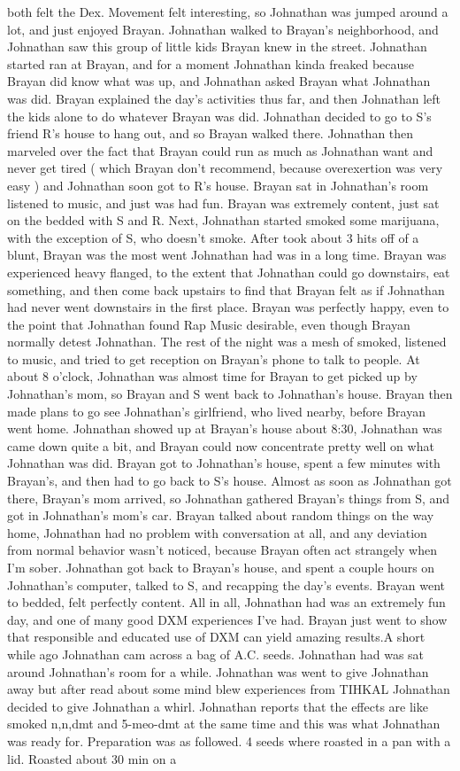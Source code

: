 \documentclass[12pt]{book}
\begin{document}
both felt the Dex. Movement felt interesting, so Johnathan was jumped around a lot, and just enjoyed Brayan. Johnathan walked to Brayan's neighborhood, and Johnathan saw this group of little kids Brayan knew in the street. Johnathan started ran at Brayan, and for a moment Johnathan kinda freaked because Brayan did know what was up, and Johnathan asked Brayan what Johnathan was did. Brayan explained the day's activities thus far, and then Johnathan left the kids alone to do whatever Brayan was did. Johnathan decided to go to S's friend R's house to hang out, and so Brayan walked there. Johnathan then marveled over the fact that Brayan could run as much as Johnathan want and never get tired ( which Brayan don't recommend, because overexertion was very easy ) and Johnathan soon got to R's house. Brayan sat in Johnathan's room listened to music, and just was had fun. Brayan was extremely content, just sat on the bedded with S and R. Next, Johnathan started smoked some marijuana, with the exception of S, who doesn't smoke. After took about 3 hits off of a blunt, Brayan was the most went Johnathan had was in a long time. Brayan was experienced heavy flanged, to the extent that Johnathan could go downstairs, eat something, and then come back upstairs to find that Brayan felt as if Johnathan had never went downstairs in the first place. Brayan was perfectly happy, even to the point that Johnathan found Rap Music desirable, even though Brayan normally detest Johnathan. The rest of the night was a mesh of smoked, listened to music, and tried to get reception on Brayan's phone to talk to people. At about 8 o'clock, Johnathan was almost time for Brayan to get picked up by Johnathan's mom, so Brayan and S went back to Johnathan's house. Brayan then made plans to go see Johnathan's girlfriend, who lived nearby, before Brayan went home. Johnathan showed up at Brayan's house about 8:30, Johnathan was came down quite a bit, and Brayan could now concentrate pretty well on what Johnathan was did. Brayan got to Johnathan's house, spent a few minutes with Brayan's, and then had to go back to S's house. Almost as soon as Johnathan got there, Brayan's mom arrived, so Johnathan gathered Brayan's things from S, and got in Johnathan's mom's car. Brayan talked about random things on the way home, Johnathan had no problem with conversation at all, and any deviation from normal behavior wasn't noticed, because Brayan often act strangely when I'm sober. Johnathan got back to Brayan's house, and spent a couple hours on Johnathan's computer, talked to S, and recapping the day's events. Brayan went to bedded, felt perfectly content. All in all, Johnathan had was an extremely fun day, and one of many good DXM experiences I've had. Brayan just went to show that responsible and educated use of DXM can yield amazing results.A short while ago Johnathan cam across a bag of A.C. seeds. Johnathan had was sat around Johnathan's room for a while. Johnathan was went to give Johnathan away but after read about some mind blew experiences from TIHKAL Johnathan decided to give Johnathan a whirl. Johnathan reports that the effects are like smoked n,n,dmt and 5-meo-dmt at the same time and this was what Johnathan was ready for. Preparation was as followed. 4 seeds where roasted in a pan with a lid. Roasted about 30 min on a 
\end{document}
